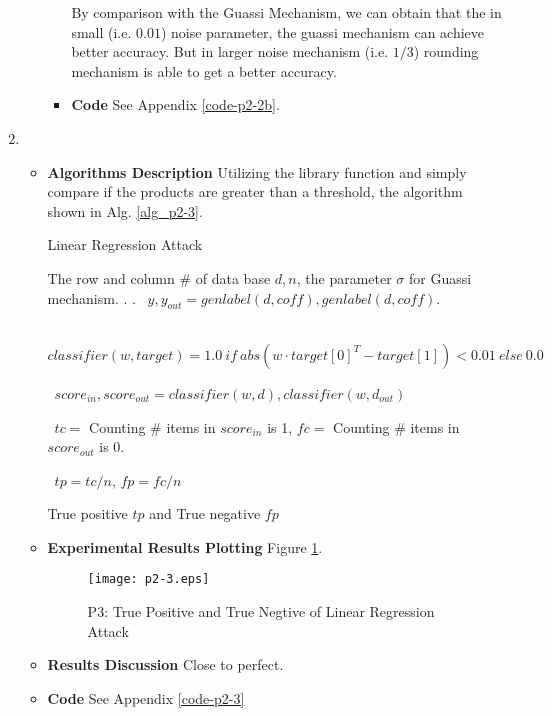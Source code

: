 \documentclass[11pt]{article}
\begin{document}
\begin{enumerate}
\begin{enumerate}
\begin{itemize}
		By comparison with the Guassi Mechanism, we can obtain that the in small (i.e. $0.01$) noise parameter, the guassi mechanism can achieve better accuracy. But in larger noise mechanism (i.e. $1/3$) rounding mechanism is able to get a better accuracy.

		\item \textbf{Code}
		See Appendix \ref{code-p2-2b}.

\end{itemize}

\end{enumerate}

\item
\begin{itemize}
	\item \textbf{Algorithms Description}
	Utilizing the library function and simply compare if the products are greater than a threshold, the algorithm shown in Alg. \ref{alg_p2-3}.

		\begin{algorithm}
		\caption{Linear Regression Attack}
		\label{alg_p2-3}
		\begin{algorithmic}
		\REQUIRE The row and column \# of data base $d, n$, the parameter $\sigma$ for Guassi mechanism.
		. 
		. 
		\ $y, y_{out} = genlabel(d, coff), genlabel(d, coff)$.
		
		\ 
		$classifier(w, target) = 
		1.0\ if\ abs(w \cdot target[0]^T - target[1]) < 0.01\ else\ 0.0$
		
		\ 
		$score_{in}, score_{out} = classifier(w, d), classifier(w, d_{out})$
		
		\ 
		$tc = $ Counting \# items in $score_{in}$ is 1, 
		$fc = $ Counting \# items in $score_{out}$ is 0.
		
		\STATE {\bf let}\  $tp = tc / n$, $fp = fc / n$

		\RETURN True positive $tp$ and True negative $fp$
		\end{algorithmic}
		\end{algorithm}

	\item \textbf{Experimental Results Plotting}
	Figure \ref{fig-p2-3}.
%
\begin{figure}[h]
    \centering
    \texttt{[image: p2-3.eps]}
    \caption{P3: True Positive and True Negtive of Linear Regression Attack}
    \label{fig-p2-3}
\end{figure}
%	
	\item \textbf{Results Discussion}
	Close to perfect.
	\item \textbf{Code}
	See Appendix \ref{code-p2-3}


\end{itemize}
\end{enumerate}
\end{document}
